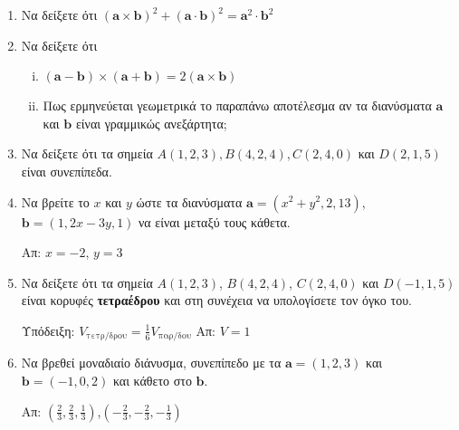 \documentclass[a4paper,table]{report}
\renewcommand{\vec}{\mathbf}
\begin{document}
\begin{enumerate}[itemsep=0.7\baselineskip]
  \item Να δείξετε ότι $ (\vec{a}\times \vec{b})^{2} + (\vec{a}\cdot \vec{b})^{2} =
    \vec{a}^{2}\cdot \vec{b}^{2} $  

  \item Να δείξετε ότι
    \begin{enumerate}[i)]
      \item $ ( \vec{a} - \vec{b} ) \times ( \vec{a} + \vec{b} ) = 2 (\vec{a} \times 
        \vec{b}) $
      \item Πως ερμηνεύεται γεωμετρικά το παραπάνω αποτέλεσμα αν τα διανύσματα 
        $ \vec{a} $ και $ \vec{b} $ είναι γραμμικώς ανεξάρτητα;
    \end{enumerate}


  \item Να δείξετε ότι τα σημεία $ A(1,2,3), B(4,2,4), C(2,4,0) $ και $ D(2,1,5) $ 
    είναι συνεπίπεδα.

  \item Να βρείτε το $x$ και $y$ ώστε τα διανύσματα $ \vec{a} = (x^{2}+y^{2},2,13) $, 
    $ \vec{b} = (1,2x-3y,1) $ να είναι μεταξύ τους κάθετα. 

    \hfill Απ: $ x=-2 $, $ y=3 $

  \item Να δείξετε ότι τα σημεία $ A(1,2,3) $, $ B(4,2,4) $, $ C(2,4,0) $ και 
    $ D(-1,1,5) $ είναι κορυφές \textbf{τετραέδρου} και στη συνέχεια να υπολογίσετε τον 
    όγκο του. 

    \textcolor{Col1}{Υπόδειξη:} 
    $ V_{\text{τετρ/δρου}} = \frac{1}{6} V_{\text{παρ/δου}} $   
    \hfill Απ: $ V=1 $

  \item Να βρεθεί μοναδιαίο διάνυσμα, συνεπίπεδο με τα $ \vec{a} = (1,2,3) $ και 
    $ \vec{b} = (-1,0,2) $ και κάθετο στο $ \vec{b} $.

    \hfill Απ: $ (\frac{2}{3}, \frac{2}{3}, \frac{1}{3}) $,$ (-\frac{2}{3},- 
    \frac{2}{3}, -\frac{1}{3})$  
\end{enumerate}
\end{document}
